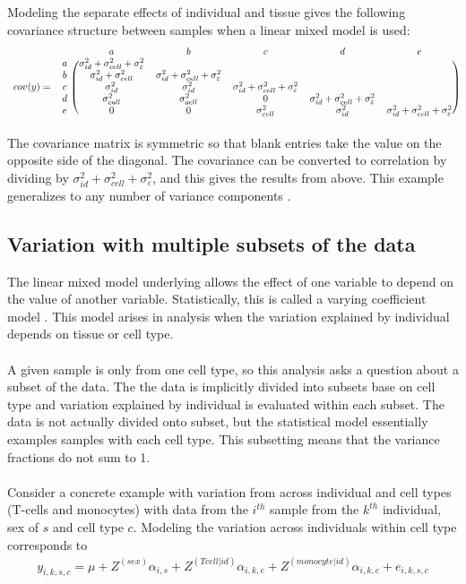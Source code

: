 \documentclass[12pt]{article}\usepackage[]{graphicx}\usepackage[]{xcolor}
\begin{document}
Modeling the separate effects of individual and tissue gives the following covariance structure between samples when a linear mixed model is used:
\[
\begin{blockarray}{ccccccc}
&& a & b & c & d & e \\
\begin{block}{cc(ccccc)}
&a &\sigma^2_{id} + \sigma^2_{cell} + \sigma^2_\varepsilon &  & & &\\
&b & \sigma^2_{id} + \sigma^2_{cell} & \sigma^2_{id} + \sigma^2_{cell} + \sigma^2_\varepsilon  & & &\\
cov(y) =  &c & \sigma^2_{id}  & \sigma^2_{id} &\sigma^2_{id} + \sigma^2_{cell} + \sigma^2_\varepsilon  & &\\
&d & \sigma^2_{cell} & \sigma^2_{cell} &0 &\sigma^2_{id} + \sigma^2_{cell} + \sigma^2_\varepsilon  &\\
&e & 0 & 0 &\sigma^2_{cell} & \sigma^2_{id} &\sigma^2_{id} + \sigma^2_{cell} + \sigma^2_\varepsilon \\
\end{block}
\end{blockarray}
 \]
 The covariance matrix is symmetric so that blank entries take the value on the opposite side of the diagonal.  The covariance can be converted to correlation by dividing by $\sigma^2_{id} + \sigma^2_{cell} + \sigma^2_\varepsilon$, and this gives the results from above.  This example generalizes to any number of variance components \cite{Pinheiro2000}.


\subsection{Variation with multiple subsets of the data} \label{sec:variationWithAcross}

The linear mixed model underlying  allows the effect of one variable to depend on the value of another variable.  Statistically, this is called a varying coefficient model \cite{Pinheiro2000, Galecki2010}.  This model arises in   analysis when the variation explained by individual depends on tissue or cell type.\\
\\
A given sample is only from one cell type, so this analysis asks a question about a subset of the data.  The the data is implicitly divided into subsets base on cell type and variation explained by individual is evaluated within each subset.    The data is not actually divided onto subset, but the statistical model essentially examples samples with each cell type.  This subsetting means that the variance fractions do not sum to 1.\\
\\
Consider a concrete example with variation from across individual and cell types (T-cells and monocytes) with data from the $i^{th}$ sample from the $k^{th}$ individual, sex of $s$ and cell type $c$.  Modeling the variation across individuals within cell type corresponds to 
\begin{eqnarray}
  y_{i,k,s,c} = \mu + Z^{(sex)} \alpha_{i,s} + Z^{(Tcell| id)} \alpha_{i,k,c} + Z^{(monocyte| id)} \alpha_{i,k,c} + e_{i,k,s,c}
\end{eqnarray}    
\end{document}
